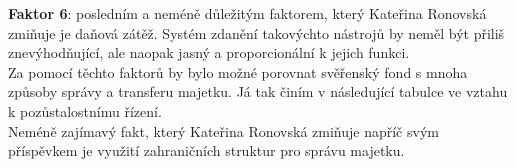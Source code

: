 \documentclass{article}
\begin{document}
\textbf{Faktor 6}: posledním a neméně důležitým faktorem, který Kateřina Ronovská zmiňuje je daňová zátěž. Systém zdanění takovýchto nástrojů by neměl být přiliš znevýhodňující, ale naopak jasný a proporcionální k jejich funkci.\\

Za pomocí těchto faktorů by bylo možné porovnat svěřenský fond s mnoha způsoby správy a transferu majetku. Já tak činím v následující tabulce ve vztahu k pozůstalostnímu řízení.\\

Neméně zajímavý fakt, který Kateřina Ronovská zmiňuje napříč svým příspěvkem je využití zahraničních struktur pro správu majetku.

\newpage


\end{document}
